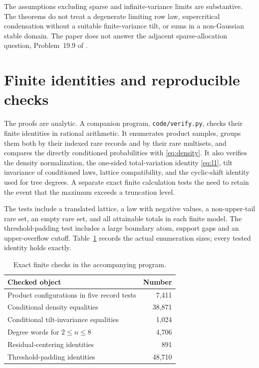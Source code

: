 The assumptions excluding sparse and infinite-variance limits are substantive. The theorems do not treat a degenerate limiting row law, supercritical condensation without a suitable finite-variance tilt, or sums in a non-Gaussian stable domain. The paper does not answer the adjacent sparse-allocation question, Problem~19.9 of \cite{Janson}.

\appendix
\section{Finite identities and reproducible checks}\label{sec:checks}
The proofs are analytic. A companion program, \texttt{code/verify.py}, checks their finite identities in rational arithmetic. It enumerates product samples, groups them both by their indexed rare records and by their rare multisets, and compares the directly conditioned probabilities with \eqref{eq:density}. It also verifies the density normalization, the one-sided total-variation identity \eqref{eq:l1}, tilt invariance of conditioned laws, lattice compatibility, and the cyclic-shift identity used for tree degrees. A separate exact finite calculation tests the need to retain the event that the maximum exceeds a truncation level.

The tests include a translated lattice, a law with negative values, a non-upper-tail rare set, an empty rare set, and all attainable totals in each finite model. The threshold-padding test includes a large boundary atom, support gaps and an upper-overflow cutoff. Table~\ref{tab:checks} records the actual enumeration sizes; every tested identity holds exactly.

\begin{table}[htbp]
\centering
\caption{Exact finite checks in the accompanying program.}\label{tab:checks}
\begin{tabular}{lr}
\toprule
Checked object & Number \\
\midrule
Product configurations in five record tests & 7,411 \\
Conditional density equalities & 38,871 \\
Conditional tilt-invariance equalities & 1,024 \\
Degree words for $2\le n\le8$ & 4,706 \\
Residual-centering identities & 891 \\
Threshold-padding identities & 48,710 \\
\bottomrule
\end{tabular}
\end{table}

